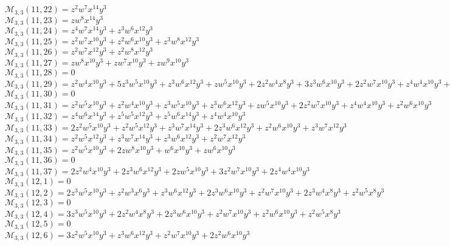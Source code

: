 \documentclass[12pt]{memoireuqam1.3}
\begin{document}
$\mathcal{M}_{3,3}(11,22)=z^2w^7x^{14}y^3$\\
$\mathcal{M}_{3,3}(11,23)=zw^8x^{14}y^3$\\
$\mathcal{M}_{3,3}(11,24)=z^4w^7x^{14}y^3+z^3w^6x^{12}y^3$\\
$\mathcal{M}_{3,3}(11,25)=z^2w^7x^{10}y^3+z^2w^6x^{10}y^3+z^3w^8x^{12}y^3$\\
$\mathcal{M}_{3,3}(11,26)=z^2w^7x^{12}y^3+z^2w^8x^{12}y^3$\\
$\mathcal{M}_{3,3}(11,27)=zw^8x^{10}y^3+zw^7x^{10}y^3+zw^9x^{10}y^3$\\
$\mathcal{M}_{3,3}(11,28)=0$\\
$\mathcal{M}_{3,3}(11,29)=z^2w^4x^{10}y^3+5z^3w^5x^{10}y^3+z^3w^6x^{12}y^3+zw^5x^{10}y^3+2z^2w^4x^8y^3+3z^3w^6x^{10}y^3+2z^2w^7x^{10}y^3+z^4w^4x^{10}y^3+z^2w^5x^8y^3$\\
$\mathcal{M}_{3,3}(11,30)=0$\\
$\mathcal{M}_{3,3}(11,31)=z^2w^5x^{10}y^3+z^2w^4x^{10}y^3+z^3w^5x^{10}y^3+z^3w^6x^{12}y^3+zw^5x^{10}y^3+2z^2w^7x^{10}y^3+z^4w^4x^{10}y^3+z^2w^6x^{10}y^3$\\
$\mathcal{M}_{3,3}(11,32)=z^4w^6x^{14}y^3+z^5w^5x^{12}y^3+z^5w^6x^{14}y^3+z^4w^4x^{10}y^3$\\
$\mathcal{M}_{3,3}(11,33)=2z^2w^5x^{10}y^3+z^2w^5x^{12}y^3+z^3w^7x^{14}y^3+2z^3w^6x^{12}y^3+z^2w^6x^{10}y^3+z^3w^7x^{12}y^3$\\
$\mathcal{M}_{3,3}(11,34)=z^2w^5x^{12}y^3+z^3w^7x^{14}y^3+z^3w^6x^{12}y^3+z^2w^7x^{12}y^3$\\
$\mathcal{M}_{3,3}(11,35)=z^2w^5x^{10}y^3+2zw^8x^{10}y^3+w^6x^{10}y^3+zw^6x^{10}y^3$\\
$\mathcal{M}_{3,3}(11,36)=0$\\
$\mathcal{M}_{3,3}(11,37)=2z^2w^4x^{10}y^3+2z^3w^6x^{12}y^3+2zw^5x^{10}y^3+3z^2w^7x^{10}y^3+2z^4w^4x^{10}y^3$\\
$\mathcal{M}_{3,3}(12,1)=0$\\
$\mathcal{M}_{3,3}(12,2)=2z^3w^5x^{10}y^3+z^2w^3x^6y^3+z^3w^6x^{12}y^3+2z^3w^6x^{10}y^3+z^2w^7x^{10}y^3+2z^3w^4x^8y^3+z^2w^5x^8y^3$\\
$\mathcal{M}_{3,3}(12,3)=0$\\
$\mathcal{M}_{3,3}(12,4)=3z^3w^5x^{10}y^3+2z^2w^4x^8y^3+2z^3w^6x^{10}y^3+z^2w^7x^{10}y^3+z^2w^6x^{10}y^3+z^2w^5x^8y^3$\\
$\mathcal{M}_{3,3}(12,5)=0$\\
$\mathcal{M}_{3,3}(12,6)=3z^2w^5x^{10}y^3+z^3w^6x^{12}y^3+z^2w^7x^{10}y^3+2z^2w^6x^{10}y^3$\\
\end{document}
